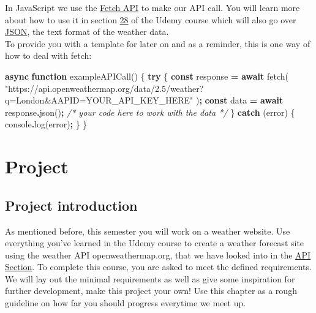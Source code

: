 \documentclass[
]{article}
\newenvironment{Shaded}{\begin{snugshade}}{\end{snugshade}}
\newcommand{\BuiltInTok}[1]{#1}
\newcommand{\CommentTok}[1]{\textcolor[rgb]{0.56,0.35,0.01}{\textit{#1}}}
\newcommand{\ControlFlowTok}[1]{\textcolor[rgb]{0.13,0.29,0.53}{\textbf{#1}}}
\newcommand{\FunctionTok}[1]{\textcolor[rgb]{0.00,0.00,0.00}{#1}}
\newcommand{\KeywordTok}[1]{\textcolor[rgb]{0.13,0.29,0.53}{\textbf{#1}}}
\newcommand{\NormalTok}[1]{#1}
\newcommand{\OperatorTok}[1]{\textcolor[rgb]{0.81,0.36,0.00}{\textbf{#1}}}
\newcommand{\StringTok}[1]{\textcolor[rgb]{0.31,0.60,0.02}{#1}}
\begin{document}
In JavaScript we use the \href{https://developer.mozilla.org/de/docs/Web/API/Fetch_API}{Fetch API} to make our API call. You will learn more about how to use it in section \href{https://www.udemy.com/course/the-web-developer-bootcamp/learn/lecture/22051352\#overview}{28} of the Udemy course which will also go over \protect\hyperlink{json}{JSON}, the text format of the weather data.\\
To provide you with a template for later on and as a reminder, this is one way of how to deal with fetch:

\begin{Shaded}
\begin{Highlighting}[]
\KeywordTok{async} \KeywordTok{function} \FunctionTok{exampleAPICall}\NormalTok{() \{}
  \ControlFlowTok{try}\NormalTok{ \{}
    \KeywordTok{const}\NormalTok{ response }\OperatorTok{=} \ControlFlowTok{await} \FunctionTok{fetch}\NormalTok{(}
      \StringTok{"https://api.openweathermap.org/data/2.5/weather?q=London\&AAPID=YOUR\_API\_KEY\_HERE"}
\NormalTok{    )}\OperatorTok{;}
    \KeywordTok{const}\NormalTok{ data }\OperatorTok{=} \ControlFlowTok{await}\NormalTok{ response}\OperatorTok{.}\FunctionTok{json}\NormalTok{()}\OperatorTok{;}
    \CommentTok{/* your code here to work with the data */}
\NormalTok{  \} }\ControlFlowTok{catch}\NormalTok{ (error) \{}
    \BuiltInTok{console}\OperatorTok{.}\FunctionTok{log}\NormalTok{(error)}\OperatorTok{;}
\NormalTok{  \}}
\NormalTok{\}}
\end{Highlighting}
\end{Shaded}

\hypertarget{project}{%
\section{Project}\label{project}}

\hypertarget{project-introduction}{%
\subsection{Project introduction}\label{project-introduction}}

As mentioned before, this semester you will work on a weather website. Use everything you've learned in the Udemy course to create a weather forecast site using the weather API openweathermap.org, that we have looked into in the \protect\hyperlink{api}{API Section}. To complete this course, you are asked to meet the defined requirements. We will lay out the minimal requirements as well as give some inspiration for further development, make this project your own! Use this chapter as a rough guideline on how far you should progress everytime we meet up.
\end{document}
